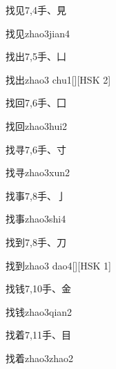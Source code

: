 \begin{Entry}{找见}{7,4}{⼿、⾒}
  \begin{Phonetics}{找见}{zhao3jian4}
  \end{Phonetics}
\end{Entry}

\begin{Entry}{找出}{7,5}{⼿、⼐}
  \begin{Phonetics}{找出}{zhao3 chu1}[][HSK 2]
  \end{Phonetics}
\end{Entry}

\begin{Entry}{找回}{7,6}{⼿、⼞}
  \begin{Phonetics}{找回}{zhao3hui2}
  \end{Phonetics}
\end{Entry}

\begin{Entry}{找寻}{7,6}{⼿、⼨}
  \begin{Phonetics}{找寻}{zhao3xun2}
  \end{Phonetics}
\end{Entry}

\begin{Entry}{找事}{7,8}{⼿、⼅}
  \begin{Phonetics}{找事}{zhao3shi4}
  \end{Phonetics}
\end{Entry}

\begin{Entry}{找到}{7,8}{⼿、⼑}
  \begin{Phonetics}{找到}{zhao3 dao4}[][HSK 1]
  \end{Phonetics}
\end{Entry}

\begin{Entry}{找钱}{7,10}{⼿、⾦}
  \begin{Phonetics}{找钱}{zhao3qian2}
  \end{Phonetics}
\end{Entry}

\begin{Entry}{找着}{7,11}{⼿、⽬}
  \begin{Phonetics}{找着}{zhao3zhao2}
  \end{Phonetics}
\end{Entry}

